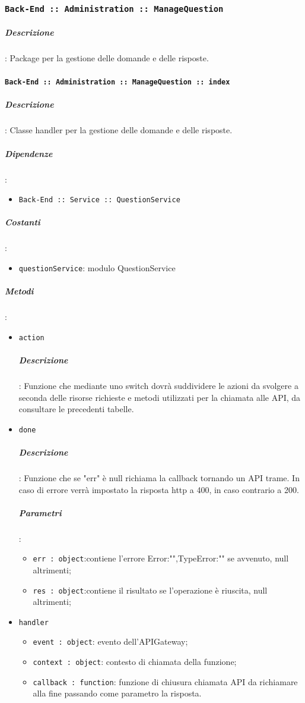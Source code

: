 \documentclass[../DefinizioneDiProdotto_v2.0.0.tex]{subfiles}
\begin{document}
\subsubsection{\texttt{Back-End :: Administration :: ManageQuestion}}
\subparagraph{Descrizione}: Package per la gestione delle domande e delle risposte.

\paragraph{\texttt{Back-End :: Administration :: ManageQuestion :: index}}
\subparagraph{Descrizione}: Classe handler per la gestione delle domande e delle risposte.
\subparagraph{Dipendenze}:
\begin{itemize}
	\item \texttt{Back-End :: Service :: QuestionService}
\end{itemize}
\subparagraph{Costanti}:
\begin{itemize}
	\item \texttt{questionService}: modulo QuestionService
\end{itemize}
\subparagraph{Metodi}:
\begin{itemize}
	\item \texttt{action}
	      \subparagraph{Descrizione}: Funzione che mediante uno switch dovrà suddividere le azioni da svolgere a seconda delle risorse richieste e metodi utilizzati per la chiamata alle API, da consultare le precedenti tabelle.
	\item \texttt{done}
	      \subparagraph{Descrizione}: Funzione che se "err" è null richiama la callback tornando un API trame. In caso di errore verrà impostato la risposta http a 400, in caso contrario a 200.
	      \subparagraph{Parametri}:
	      \begin{itemize}
	      	\item \texttt{err : object}:contiene l'errore {Error:"",TypeError:""} se avvenuto, null altrimenti;
	      	\item \texttt{res : object}:contiene il risultato se l'operazione è riuscita, null altrimenti;
	      \end{itemize}
	\item \texttt{handler}
	      \begin{itemize}
	      	\item \texttt{event : object}: evento dell'APIGateway;
	      	\item \texttt{context : object}: contesto di chiamata della funzione;
	      	\item \texttt{callback : function}: funzione di chiusura chiamata API da richiamare alla fine passando come parametro la risposta.
	      \end{itemize}
\end{itemize}
\end{document}
